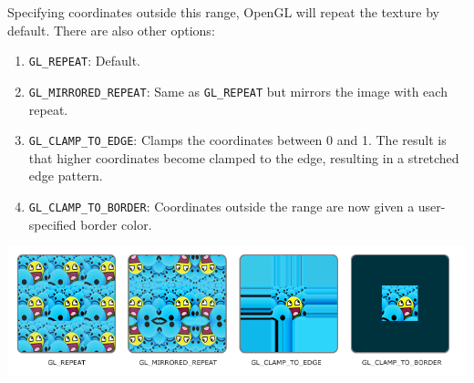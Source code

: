 Specifying coordinates outside this range, OpenGL will repeat the texture by default. There are also other options:

\begin{enumerate}
    \item \verb|GL_REPEAT|: Default.
    \item \verb|GL_MIRRORED_REPEAT|: Same as \verb|GL_REPEAT| but mirrors the image with each repeat.
    \item \verb|GL_CLAMP_TO_EDGE|: Clamps the coordinates between 0 and 1. The result is that higher coordinates become clamped to the edge, resulting in a stretched edge pattern.
    \item \verb|GL_CLAMP_TO_BORDER|: Coordinates outside the range are now given a user-specified border color.
\end{enumerate}

\begin{center}
    \includegraphics[scale=0.5]{pics/texture_wrapping.png}
\end{center}